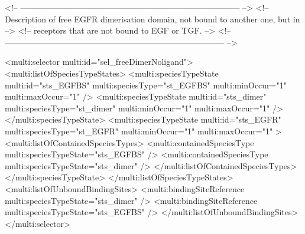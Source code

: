 \begin{example}
<!-- -------------------------------------------------------------------------------- -->
<!-- Description of free EGFR dimerisation domain, not bound to another one, but in   --> 
<!-- receptors that are not bound to EGF or TGF.                                      -->
<!-- -------------------------------------------------------------------------------- -->

      <multi:selector multi:id="sel_freeDimerNoligand">
        <multi:listOfSpeciesTypeStates>
          <multi:speciesTypeState multi:id="sts_EGFBS" multi:speciesType="st_EGFBS" 
                                  multi:minOccur="1" multi:maxOccur="1" />
          <multi:speciesTypeState multi:id="sts_dimer" multi:speciesType="st_dimer" 
                                  multi:minOccur="1" multi:maxOccur="1" />
          </multi:speciesTypeState>
          <multi:speciesTypeState multi:id="sts_EGFR" multi:speciesType="st_EGFR" 
                                  multi:minOccur="1" multi:maxOccur="1" >
            <multi:listOfContainedSpeciesTypes>
              <multi:containedSpeciesType multi:speciesTypeState="sts_EGFBS" /> 
              <multi:containedSpeciesType multi:speciesTypeState="sts_dimer" /> 
            </multi:listOfContainedSpeciesTypes>            
          </multi:speciesTypeState>
        </multi:listOfSpeciesTypeStates>
        <multi:listOfUnboundBindingSites>
          <multi:bindingSiteReference multi:speciesTypeState="sts_dimer" />
          <multi:bindingSiteReference multi:speciesTypeState="sts_EGFBS" />
        </multi:listOfUnboundBindingSites>
      </multi:selector>
\end{example}

